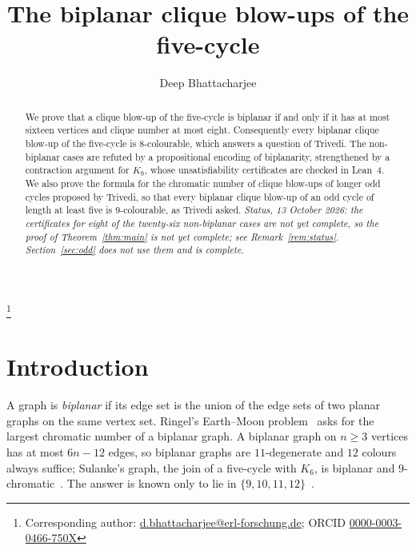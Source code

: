 \documentclass[11pt]{amsart}
\theoremstyle{definition}
\theoremstyle{remark}
\numberwithin{equation}{section}
\begin{document}
\title{The biplanar clique blow-ups of the five-cycle}

\author{Deep Bhattacharjee}
\address{Formerly, Electro-Gravitational Space Propulsion Laboratory (EGSPL),\newline Bhubaneswar, Odisha 751030, India}
\thanks{Corresponding author: \href{mailto:d.bhattacharjee@erl-forschung.de}{d.bhattacharjee@erl-forschung.de}; ORCID \href{https://orcid.org/0000-0003-0466-750X}{\mbox{0000-0003-0466-750X}}}


\begin{abstract}
We prove that a clique blow-up of the five-cycle is biplanar if and only if it has at most sixteen vertices and clique number at most eight. Consequently every biplanar clique blow-up of the five-cycle is $8$-colourable, which answers a question of Trivedi. The non-biplanar cases are refuted by a propositional encoding of biplanarity, strengthened by a contraction argument for $K_9$, whose unsatisfiability certificates are checked in Lean~4. We also prove the formula for the chromatic number of clique blow-ups of longer odd cycles proposed by Trivedi, so that every biplanar clique blow-up of an odd cycle of length at least five is $9$-colourable, as Trivedi asked. \emph{Status, 13 October 2026: the certificates for eight of the twenty-six non-biplanar cases are not yet complete, so the proof of Theorem~\ref{thm:main} is not yet complete; see Remark~\ref{rem:status}. Section~\ref{sec:odd} does not use them and is complete.}
\end{abstract}

\maketitle

\section{Introduction}

A graph is \emph{biplanar} if its edge set is the union of the edge sets of two planar graphs on the same vertex set. Ringel's Earth--Moon problem~\cite{Ri} asks for the largest chromatic number of a biplanar graph. A biplanar graph on $n\ge 3$ vertices has at most $6n-12$ edges, so biplanar graphs are $11$-degenerate and $12$ colours always suffice; Sulanke's graph, the join of a five-cycle with $K_6$, is biplanar and $9$-chromatic~\cite{Ga,Hu}. The answer is known only to lie in $\{9,10,11,12\}$~\cite{Ge}.
\end{document}
